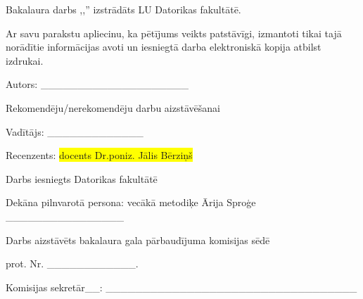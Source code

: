 \newcommand{\makedocpagee}{
		\thispagestyle{empty} 
		Bakalaura darbs ,,\@nosaukums''
		izstrādāts LU Datorikas fakultātē.
		\vspace{3cm} 
		
		Ar savu parakstu apliecinu, ka pētījums veikts patstāvīgi, 
		izmantoti tikai tajā norādītie informācijas avoti un iesniegtā darba elektroniskā kopija atbilst izdrukai.

		Autors: \_\_\_\_\_\_\_\_\_\_\_\_\_\_\_\_\_\_\_\_
		{\@autors}
		\vspace{3cm} 
		
		Rekomendēju/nerekomendēju darbu aizstāvēšanai

		Vadītājs: {\@vaditajs} 
		\_\_\_\_\_\_\_\_\_\_\_\_\_ {\@datums}
		
		\vspace{3cm} 
		{\raggedright
		Recenzents: \colorbox[HTML]{FFFF00}{docents Dr.poniz. J\={a}lis
		B\={e}rzi\c{n}\v{s}}}

		\vspace{3cm}
		Darbs iesniegts Datorikas fakultātē  {\@datums}

		Dekāna pilnvarotā persona: vecākā metodiķe Ārija Sproģe \_\_\_\_\_\_\_\_\_\_\_\_\_\_\_\_
		\vspace{3cm} 
		
		Darbs aizstāvēts bakalaura gala pārbaudījuma komisijas sēdē

		{\@datums} prot. Nr.
		\_\_\_\_\_\_\_\_\_\_\_\_.

		Komisijas sekretār\_\_:  \_\_\_\_\_\_\_\_\_\_\_\_\_\_\_\_\_\_\_\_\_\_\_\_\_\_\_\_\_\_\_\_\_\_
}
\makedocpagee

